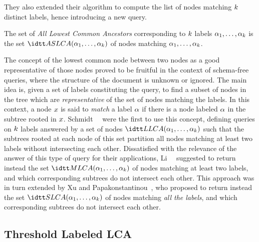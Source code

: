 \begin{LONG}
They also extended their algorithm to compute the list of nodes
matching $k$ distinct labels, hence introducing a new query.

\begin{definition}[\ALCASET\
  queries~\cite{efficientKeywordSearchForSmallestLCAsInXMLDatabases}]
  The set of {\em All Lowest Common Ancestors} corresponding to
  $k$ labels $\alpha_1,\ldots,\alpha_{k}$ is the set
  $\ALCASET(\lab_1,\ldots,\lab_\nbkeywords)$ of nodes matching
  $\alpha_1,\ldots,\alpha_{k}$.
\end{definition}

\end{LONG}

\begin{SHORT}
  The concept of the lowest common node between two nodes as a good
  representative of those nodes proved to be fruitful in the context
  of schema-free queries, where the structure of the document is
  unknown or ignored.
  The main idea is, given a set of labels constituting the query, to
  find a subset of nodes in the tree which are {\em representative} of
  the set of nodes matching the labels.
  In this context, a node $x$ is said to {\em match} a label
  $\alpha$ if there is a node labeled $\alpha$ in the subtree rooted
  in $x$.
%
  Schmidt~\etal~\cite{nearestConceptQueries} were the first to use
  this concept, defining queries on $k$ labels answered by a
  set of nodes $\LCASET(\lab_1,\ldots,\lab_\nbkeywords)$ such that the
  subtrees rooted at each node of this set partition all nodes
  matching at least two labels without intersecting each other.
  Dissatisfied with the relevance of the answer of this type of query
  for their applications, Li~\etal~\cite{schemaFreeXQuery} suggested
  to return instead the set $\MLCASET(\lab_1,\ldots,\lab_\nbkeywords)$
  of nodes matching at least two labels, and which corresponding
  subtrees do not intersect each other.
  This approach was in turn extended by Xu and
  Papakonstantinou~\cite{efficientKeywordSearchForSmallestLCAsInXMLDatabases},
  who proposed to return instead the set
  $\SLCA(\lab_1,\ldots,\lab_\nbkeywords)$ of nodes matching {\em all
    the labels}, and which corresponding subtrees do not intersect
  each other.
\end{SHORT}
  



\begin{LONG}
  \subsection{Threshold Labeled LCA}
  \label{sec:thresh-label-lca}
\end{LONG}

